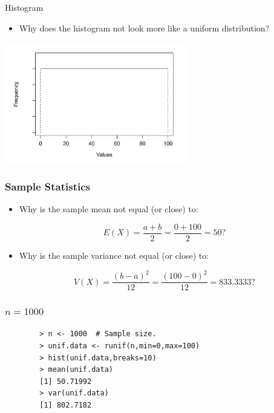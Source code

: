 \documentclass[12pt]{beamer}
\begin{document}
\begin{frame}{Histogram}
	
\begin{itemize}[label={\color{blue}$\blacktriangleright$}]
	\item Why does the histogram not look more like a uniform distribution?
\end{itemize}
	
	\centering
	\includegraphics[width=8cm]{histo2.png}
	
\end{frame}

\begin{frame}
	\frametitle{Sample Statistics}
	
	\begin{itemize}[label={\color{blue}$\blacktriangleright$}]
		\item Why is the sample mean not equal (or close) to:
		
		\[E(X) = \frac{a + b}{2} = \frac{0 + 100}{2} = 50?\]
		
		\item Why is the sample variance not equal (or close) to:
		
		\[V(X) = \frac{(b - a)^2}{12} = \frac{(100 - 0)^2}{12} = 833.3333?\]
	\end{itemize}
	
\end{frame}

\begin{frame}[fragile]
	\frametitle{$n = 1000$}
	
	\begin{verbatim}
		> n <- 1000  # Sample size.
		> unif.data <- runif(n,min=0,max=100)
		> hist(unif.data,breaks=10)
		> mean(unif.data)
		[1] 50.71992
		> var(unif.data)
		[1] 802.7182
	\end{verbatim}
	
\end{frame}
\end{document}
